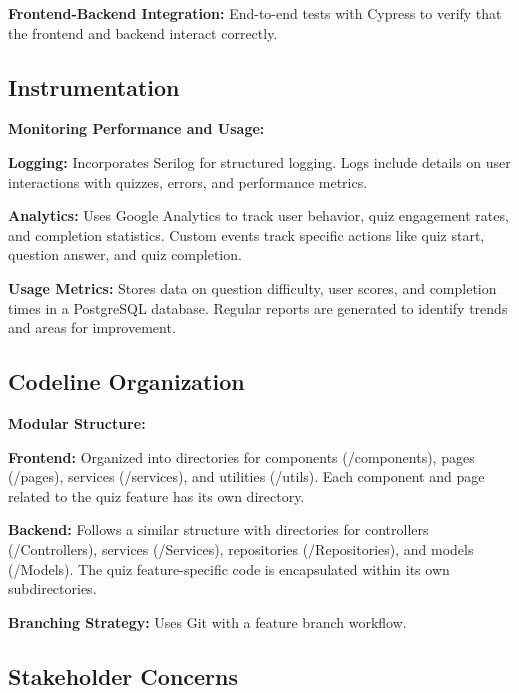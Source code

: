 \item \textbf{Frontend-Backend Integration:} End-to-end tests with Cypress to verify that the frontend and backend interact correctly.

\subsection{Instrumentation}

\item \textbf{Monitoring Performance and Usage:}

\item \textbf{Logging:} Incorporates Serilog for structured logging. Logs include details on user interactions with quizzes, errors, and performance metrics.

\item \textbf{Analytics:} Uses Google Analytics to track user behavior, quiz engagement rates, and completion statistics. Custom events track specific actions like quiz start, question answer, and quiz completion.

\item \textbf{Usage Metrics:} Stores data on question difficulty, user scores, and completion times in a PostgreSQL database. Regular reports are generated to identify trends and areas for improvement.

\subsection{Codeline Organization}

\textbf{Modular Structure:}

\item \textbf{Frontend:} Organized into directories for components (/components), pages (/pages), services (/services), and utilities (/utils). Each component and page related to the quiz feature has its own directory.

\item \textbf{Backend:} Follows a similar structure with directories for controllers (/Controllers), services (/Services), repositories (/Repositories), and models (/Models). The quiz feature-specific code is encapsulated within its own subdirectories.

\item \textbf{Branching Strategy:} Uses Git with a feature branch workflow.

\subsection{Stakeholder Concerns}

